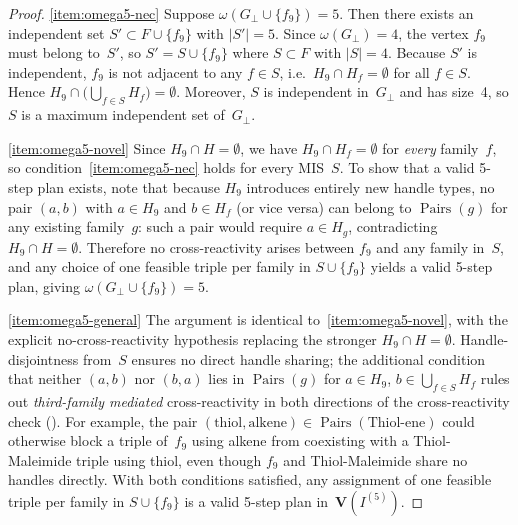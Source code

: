 \documentclass[10pt,a4paper]{amsart}
\DeclareMathOperator{\Pairs}{Pairs}
\newcommand{\Var}{\mathbf{V}}
\begin{document}
\begin{proof}
\cref{item:omega5-nec}\;
Suppose $\omega(G_\perp \cup \{f_9\}) = 5$.
Then there exists an independent set $S' \subset F \cup \{f_9\}$
with $|S'| = 5$.  Since $\omega(G_\perp) = 4$, the vertex
$f_9$ must belong to~$S'$, so $S' = S \cup \{f_9\}$ where
$S \subset F$ with $|S| = 4$.  Because $S'$ is independent,
$f_9$ is not adjacent to any $f \in S$, i.e.\
$H_9 \cap H_f = \emptyset$ for all $f \in S$.  Hence
$H_9 \cap \bigl(\bigcup_{f \in S} H_f\bigr) = \emptyset$.
Moreover, $S$ is independent in~$G_\perp$ and has size~4,
so $S$ is a maximum independent set of~$G_\perp$.

\cref{item:omega5-novel}\;
Since $H_9 \cap H = \emptyset$, we have $H_9 \cap H_f = \emptyset$
for \emph{every} family~$f$, so condition~\cref{item:omega5-nec}
holds for every MIS~$S$.  To show that a valid 5-step plan
exists, note that because $H_9$ introduces entirely new handle
types, no pair $(a, b)$ with $a \in H_9$ and $b \in H_f$ (or
vice versa) can belong to $\Pairs(g)$ for any existing family~$g$:
such a pair would require $a \in H_g$, contradicting
$H_9 \cap H = \emptyset$.  Therefore no cross-reactivity
arises between $f_9$ and any family in~$S$, and any choice
of one feasible triple per family in $S \cup \{f_9\}$ yields a
valid 5-step plan, giving $\omega(G_\perp \cup \{f_9\}) = 5$.

\cref{item:omega5-general}\;
The argument is identical to~\cref{item:omega5-novel}, with the
explicit no-cross-reactivity hypothesis replacing the stronger
$H_9 \cap H = \emptyset$.  Handle-disjointness from~$S$ ensures
no direct handle sharing; the additional condition that neither
$(a, b)$ nor $(b, a)$ lies in $\Pairs(g)$ for $a \in H_9$,
$b \in \bigcup_{f \in S} H_f$ rules out \emph{third-family
mediated} cross-reactivity in both directions of the
cross-reactivity check ().
For example, the pair $(\text{thiol}, \text{alkene}) \in
\Pairs(\text{Thiol-ene})$ could otherwise block a triple of~$f_9$
using alkene from coexisting with a Thiol-Maleimide triple using
thiol, even though $f_9$ and Thiol-Maleimide share no handles
directly.  With both conditions satisfied, any assignment of one
feasible triple per family in $S \cup \{f_9\}$ is a valid 5-step
plan in~$\Var(I^{(5)})$.
\end{proof}
\end{document}
